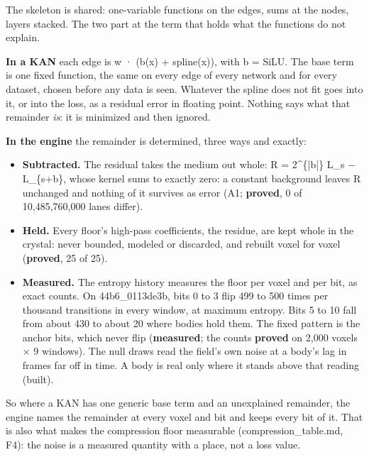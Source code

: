The skeleton is shared: one-variable functions on the edges, sums at the nodes, layers stacked. The two part at the term that holds what the functions do not explain.

\textbf{In a KAN} each edge is w · (b(x) + spline(x)), with b = SiLU. The base term is one fixed function, the same on every edge of every network and for every dataset, chosen before any data is seen. Whatever the spline does not fit goes into it, or into the loss, as a residual error in floating point. Nothing says what that remainder \emph{is}: it is minimized and then ignored.

\textbf{In the engine} the remainder is determined, three ways and exactly:

\begin{itemize}
\item \textbf{Subtracted.} The residual takes the medium out whole: R = 2\textasciicircum{}\{|b|\} L\_\allowbreak{}s − L\_\allowbreak{}\{s+b\}, whose kernel sums to exactly zero: a constant background leaves R unchanged and nothing of it survives as error (A1; \textbf{proved}, 0 of 10,485,760,000 lanes differ).
\item \textbf{Held.} Every floor's high-pass coefficients, the residue, are kept whole in the crystal: never bounded, modeled or discarded, and rebuilt voxel for voxel (\textbf{proved}, 25 of 25).
\item \textbf{Measured.} The entropy history measures the floor per voxel and per bit, as exact counts. On 44b6\_\allowbreak{}0113de3b, bits 0 to 3 flip 499 to 500 times per thousand transitions in every window, at maximum entropy. Bits 5 to 10 fall from about 430 to about 20 where bodies hold them. The fixed pattern is the anchor bits, which never flip (\textbf{measured}; the counts \textbf{proved} on 2,000 voxels × 9 windows). The null draws read the field's own noise at a body's lag in frames far off in time. A body is real only where it stands above that reading (built).
\end{itemize}

So where a KAN has one generic base term and an unexplained remainder, the engine names the remainder at every voxel and bit and keeps every bit of it. That is also what makes the compression floor measurable (compression\_\allowbreak{}table.md, F4): the noise is a measured quantity with a place, not a loss value.

